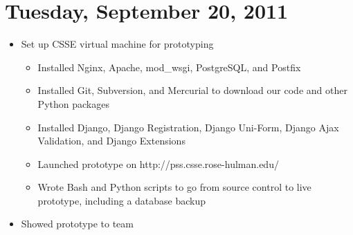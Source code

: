 \documentclass{article}
\begin{document}
\section{Tuesday, September 20, 2011}
\begin{itemize}
\item Set up CSSE virtual machine for prototyping
    \begin{itemize}
    \item Installed Nginx, Apache, mod\_wsgi, PostgreSQL, and Postfix
    \item Installed Git, Subversion, and Mercurial to download our code and other Python packages
    \item Installed Django, Django Registration, Django Uni-Form, Django Ajax Validation, and Django Extensions
    \item Launched prototype on http://pss.csse.rose-hulman.edu/
    \item Wrote Bash and Python scripts to go from source control to live prototype, including a database backup
    \end{itemize}
\item Showed prototype to team
\end{itemize}
\end{document}
